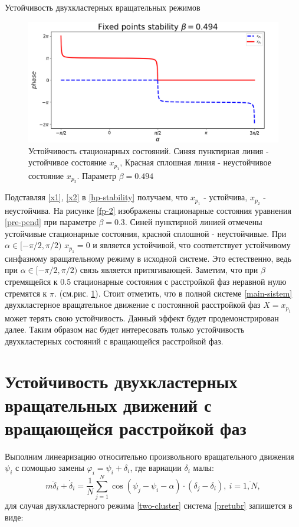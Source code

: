 \begin{chapter}{Устойчивость двухкластерных вращательных режимов}
	\begin{figure}[h!]
		\begin{center}
			\includegraphics[width=1\columnwidth]{pictures/fixed-points-3.png}
		\end{center}
		\caption{Устойчивость стационарных состояний.
		Синяя пунктирная линия - устойчивое состояние $x_{p_1}$,
		Красная сплошная линия - неустойчивое состояние $x_{p_2}$.
		Параметр $\beta = 0.494$}
		\label{fp-3}
	\end{figure}
	Подставляя \eqref{x1}, \eqref{x2} в \eqref{hp-stability} получаем, что $x_{p_1}$ - устойчива, $x_{p_2}$ - неустойчива. На рисунке \ref{fp-2} изображены стационарные состояния уравнения \eqref{pre-pend} при параметре $\beta = 0.3$.
	Синей пунктирной линией отмечены устойчивые стационарные состояния,
	красной сплошной - неустойчивые. При $\alpha \in [-\pi/2, \pi/2)$ $x_{p_1} = 0$ и является устойчивой, что соответствует
	устойчивому синфазному вращательному режиму в исходной системе. Это естественно, ведь при $\alpha \in [-\pi/2, \pi/2)$ связь является
	притягивающей. Заметим, что при $\beta$ стремящейся к 0.5 стационарные состояния с расстройкой фаз неравной нулю стремятся
	к $\pi$. (см.рис. \ref{fp-3}).
	Стоит отметить, что в полной системе \eqref{main-sistem} двухкластерное вращательное движение с постоянной расстройкой фаз $X = x_{p_1}$
	может терять свою устойчивость. Данный эффект будет продемонстрирован далее.
	Таким образом нас будет интересовать только устойчивость двухкластерных состояний с вращающейся расстройкой фаз.
	
	\section{Устойчивость двухкластерных вращательных движений с вращающейся расстройкой фаз}

	Выполним линеаризацию относительно произвольного вращательного движения $\psi_i$ с помощью замены $\varphi_i = \psi_i + \delta_i$, где вариации $\delta_i$ малы:
	\begin{equation} \label{pretubr}
		m\ddot{\delta}_i + \dot{\delta}_i = \frac{1}{N} \sum_{j = 1}^N \cos{(\psi_j - \psi_i - \alpha)} \cdot (\delta_j - \delta_i), \ i = \overline{1, N},
	\end{equation}
	для случая двухкластерного режима \eqref{two-cluster} система \eqref{pretubr} запишется в виде:
	

\end{chapter}
